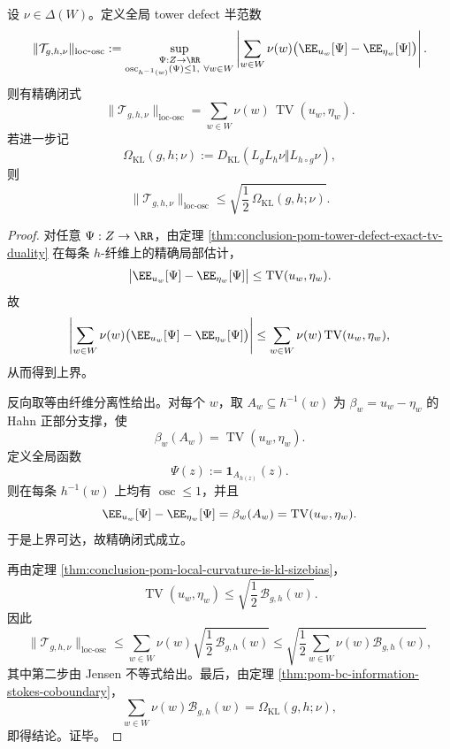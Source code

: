 \begin{theorem}\label{thm:conclusion-pom-global-tower-defect-locosc-exact}
设 \(\nu\in\Delta(W)\)。定义全局 tower defect 半范数
\[
\|\mathcal T_{g,h,\nu}\|_{\mathrm{loc\mbox{-}osc}}
:=
\sup_{\substack{\Psi:Z\to\RR\\
\operatorname{osc}_{h^{-1}(w)}(\Psi)\le 1,\ \forall w\in W}}
\left|
\sum_{w\in W}\nu(w)\bigl(\EE_{u_w}[\Psi]-\EE_{\eta_w}[\Psi]\bigr)
\right|.
\]
则有精确闭式
\[
\|\mathcal T_{g,h,\nu}\|_{\mathrm{loc\mbox{-}osc}}
=
\sum_{w\in W}\nu(w)\,\operatorname{TV}(u_w,\eta_w).
\]
若进一步记
\[
\Omega_{\mathrm{KL}}(g,h;\nu)
:=
D_{\mathrm{KL}}(L_gL_h\nu\Vert L_{h\circ g}\nu),
\]
则
\[
\|\mathcal T_{g,h,\nu}\|_{\mathrm{loc\mbox{-}osc}}
\le
\sqrt{\frac12\,\Omega_{\mathrm{KL}}(g,h;\nu)}.
\]
\end{theorem}
\begin{proof}
对任意 \(\Psi:Z\to\RR\)，由定理 \ref{thm:conclusion-pom-tower-defect-exact-tv-duality} 在每条 \(h\)-纤维上的精确局部估计，
\[
\bigl|\EE_{u_w}[\Psi]-\EE_{\eta_w}[\Psi]\bigr|
\le
\operatorname{TV}(u_w,\eta_w).
\]
故
\[
\left|
\sum_{w\in W}\nu(w)\bigl(\EE_{u_w}[\Psi]-\EE_{\eta_w}[\Psi]\bigr)
\right|
\le
\sum_{w\in W}\nu(w)\operatorname{TV}(u_w,\eta_w),
\]
从而得到上界。

反向取等由纤维分离性给出。对每个 \(w\)，取 \(A_w\subseteq h^{-1}(w)\) 为 \(\beta_w=u_w-\eta_w\) 的 Hahn 正部分支撑，使
\[
\beta_w(A_w)=\operatorname{TV}(u_w,\eta_w).
\]
定义全局函数
\[
\Psi(z):=\mathbf 1_{A_{h(z)}}(z).
\]
则在每条 \(h^{-1}(w)\) 上均有 \(\operatorname{osc}\le 1\)，并且
\[
\EE_{u_w}[\Psi]-\EE_{\eta_w}[\Psi]
=
\beta_w(A_w)
=
\operatorname{TV}(u_w,\eta_w).
\]
于是上界可达，故精确闭式成立。

再由定理 \ref{thm:conclusion-pom-local-curvature-is-kl-sizebias}，
\[
\operatorname{TV}(u_w,\eta_w)\le \sqrt{\frac12\,\mathcal B_{g,h}(w)}.
\]
因此
\[
\|\mathcal T_{g,h,\nu}\|_{\mathrm{loc\mbox{-}osc}}
\le
\sum_{w\in W}\nu(w)\sqrt{\frac12\,\mathcal B_{g,h}(w)}
\le
\sqrt{\frac12\sum_{w\in W}\nu(w)\mathcal B_{g,h}(w)},
\]
其中第二步由 Jensen 不等式给出。最后，由定理 \ref{thm:pom-bc-information-stokes-coboundary}，
\[
\sum_{w\in W}\nu(w)\mathcal B_{g,h}(w)=\Omega_{\mathrm{KL}}(g,h;\nu),
\]
即得结论。证毕。
\end{proof}

